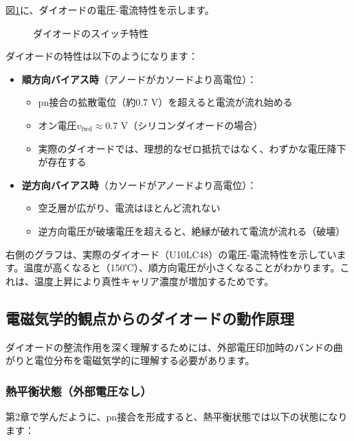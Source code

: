 図\ref{fig:diode_characteristics}に、ダイオードの電圧-電流特性を示します。

\begin{figure}[H]
\centering
{}
\caption{ダイオードのスイッチ特性}
\label{fig:diode_characteristics}
\end{figure}

ダイオードの特性は以下のようになります：

\begin{itemize}
\item \textbf{順方向バイアス時}（アノードがカソードより高電位）：
\begin{itemize}
\item pn接合の拡散電位（約0.7 V）を超えると電流が流れ始める
\item オン電圧$v_{\text{fwd}} \approx 0.7$ V（シリコンダイオードの場合）
\item 実際のダイオードでは、理想的なゼロ抵抗ではなく、わずかな電圧降下が存在する
\end{itemize}

\item \textbf{逆方向バイアス時}（カソードがアノードより高電位）：
\begin{itemize}
\item 空乏層が広がり、電流はほとんど流れない
\item 逆方向電圧が破壊電圧を超えると、絶縁が破れて電流が流れる（破壊）
\end{itemize}
\end{itemize}

右側のグラフは、実際のダイオード（U10LC48）の電圧-電流特性を示しています。温度が高くなると（150℃）、順方向電圧が小さくなることがわかります。これは、温度上昇により真性キャリア濃度が増加するためです。

\subsection{電磁気学的観点からのダイオードの動作原理}

ダイオードの整流作用を深く理解するためには、外部電圧印加時のバンドの曲がりと電位分布を電磁気学的に理解する必要があります。

\subsubsection{熱平衡状態（外部電圧なし）}

第2章で学んだように、pn接合を形成すると、熱平衡状態では以下の状態になります：

